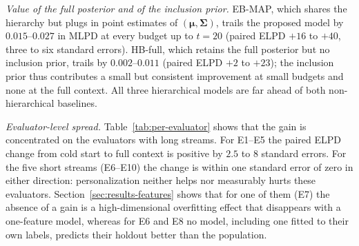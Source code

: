 \documentclass[lettersize,journal]{IEEEtran}
\begin{document}
\emph{Value of the full posterior and of the inclusion prior.} EB-MAP, which shares the hierarchy but plugs in point estimates of $(\bm\mu,\bm\Sigma)$, trails the proposed model by $0.015$--$0.027$ in MLPD at every budget up to $t=20$ (paired ELPD $+16$ to $+40$, three to six standard errors). HB-full, which retains the full posterior but no inclusion prior, trails by $0.002$--$0.011$ (paired ELPD $+2$ to $+23$); the inclusion prior thus contributes a small but consistent improvement at small budgets and none at the full context. All three hierarchical models are far ahead of both non-hierarchical baselines.

\emph{Evaluator-level spread.} Table~\ref{tab:per-evaluator} shows that the gain is concentrated on the evaluators with long streams. For E1--E5 the paired ELPD change from cold start to full context is positive by $2.5$ to $8$ standard errors. For the five short streams (E6--E10) the change is within one standard error of zero in either direction: personalization neither helps nor measurably hurts these evaluators. Section~\ref{sec:results-features} shows that for one of them (E7) the absence of a gain is a high-dimensional overfitting effect that disappears with a one-feature model, whereas for E6 and E8 no model, including one fitted to their own labels, predicts their holdout better than the population.
\end{document}
